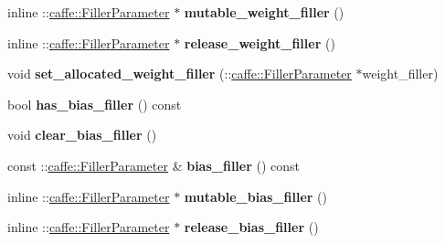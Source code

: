 \begin{DoxyCompactItemize}
inline \+::\mbox{\hyperlink{classcaffe_1_1_filler_parameter}{caffe\+::\+Filler\+Parameter}} $\ast$ {\bfseries mutable\+\_\+weight\+\_\+filler} ()
\item 
\mbox{\label{classcaffe_1_1_recurrent_parameter_a58879228e83c05c101d52de654ec7911}} 
inline \+::\mbox{\hyperlink{classcaffe_1_1_filler_parameter}{caffe\+::\+Filler\+Parameter}} $\ast$ {\bfseries release\+\_\+weight\+\_\+filler} ()
\item 
\mbox{\label{classcaffe_1_1_recurrent_parameter_aae3ea629899ddc3b7d39c0cea9bf7364}} 
void {\bfseries set\+\_\+allocated\+\_\+weight\+\_\+filler} (\+::\mbox{\hyperlink{classcaffe_1_1_filler_parameter}{caffe\+::\+Filler\+Parameter}} $\ast$weight\+\_\+filler)
\item 
\mbox{\label{classcaffe_1_1_recurrent_parameter_a6f0aba5f3c029c60af99535fa06e718c}} 
bool {\bfseries has\+\_\+bias\+\_\+filler} () const
\item 
\mbox{\label{classcaffe_1_1_recurrent_parameter_a14a000ec699c6c1ffb29682573723134}} 
void {\bfseries clear\+\_\+bias\+\_\+filler} ()
\item 
\mbox{\label{classcaffe_1_1_recurrent_parameter_a18efaa80f76c67071ae5154aa36e9bdd}} 
const \+::\mbox{\hyperlink{classcaffe_1_1_filler_parameter}{caffe\+::\+Filler\+Parameter}} \& {\bfseries bias\+\_\+filler} () const
\item 
\mbox{\label{classcaffe_1_1_recurrent_parameter_a3ed12d1ad6daf8bb74bf8fa4b0faf238}} 
inline \+::\mbox{\hyperlink{classcaffe_1_1_filler_parameter}{caffe\+::\+Filler\+Parameter}} $\ast$ {\bfseries mutable\+\_\+bias\+\_\+filler} ()
\item 
\mbox{\label{classcaffe_1_1_recurrent_parameter_a22a0d25aa5a98a0268994c2f358fa842}} 
inline \+::\mbox{\hyperlink{classcaffe_1_1_filler_parameter}{caffe\+::\+Filler\+Parameter}} $\ast$ {\bfseries release\+\_\+bias\+\_\+filler} ()
\item 
\mbox{\label{classcaffe_1_1_recurrent_parameter_a168299536034d5ddb6abff46e36016e8}} 

\end{DoxyCompactItemize}

